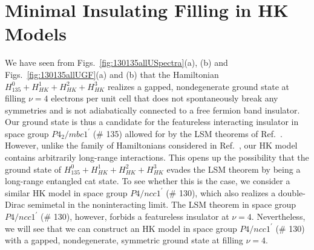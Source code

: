 \documentclass[prb,aps,amssymb,twocolumn,notitlepage]{revtex4-2}
\begin{document}
\section{Minimal Insulating Filling in HK Models}\label{sec:comparison}

We have seen from Figs.~\ref{fig:130135allUSpectra}(a), (b) and Figs.~\ref{fig:130135allUGF}(a) and (b) that the Hamiltonian $H^{0}_{135}+H^{1}_{HK}+H^{2}_{HK}+H^{3}_{HK}$ realizes a gapped, nondegenerate ground state at filling $\nu=4$ electrons per unit cell that does not spontaneously break any symmetries and is not adiabatically connected to a free fermion band insulator. 
Our ground state is thus a candidate for the featureless interacting insulator in space group $P4_2/mbc1^\prime$ (\# 135) allowed for by the LSM theorems of Ref.~\cite{watanabe2015filling}. 
However, unlike the family of Hamiltonians considered in Ref.~\cite{watanabe2015filling}, our HK model contains arbitrarily long-range interactions. 
This opens up the possibility that the ground state of $H^{0}_{135}+H^{1}_{HK}+H^{2}_{HK}+H^{3}_{HK}$ evades the LSM theorem by being a long-range entangled cat state. 
To see whether this is the case, we consider a similar HK model in space group $P4/ncc1^\prime$ (\# 130), which also realizes a double-Dirac semimetal in the noninteracting limit. 
The LSM theorem in space group $P4/ncc1^\prime$ (\# 130), however, forbids a featureless insulator at $\nu=4$. 
Nevertheless, we will see that we can construct an HK model in space group $P4/ncc1^\prime$ (\# 130) with a gapped, nondegenerate, symmetric ground state at filling $\nu=4$.
\end{document}
